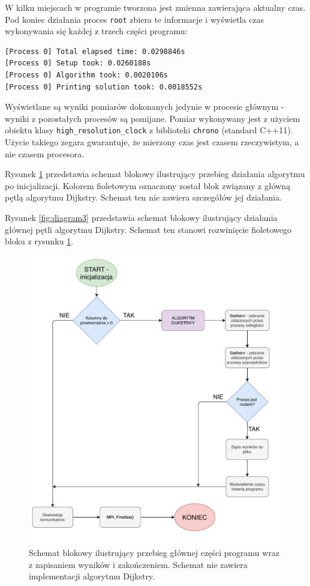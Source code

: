 \documentclass[12pt]{article}
\begin{document}
\vspace{5mm}
W kilku miejscach w programie tworzona jest zmienna zawierająca aktualny czas. Pod koniec działania proces \lstinline{root} zbiera te informacje i wyświetla czas wykonywania się każdej z trzech części programu:
\begin{lstlisting}
[Process 0] Total elapsed time: 0.0298846s
[Process 0] Setup took: 0.0260188s
[Process 0] Algorithm took: 0.0020106s
[Process 0] Printing solution took: 0.0018552s
\end{lstlisting}
Wyświetlane są wyniki pomiarów dokonanych jedynie w procesie głównym - wyniki z pozostałych procesów są pomijane. Pomiar wykonywany jest z użyciem obiektu klasy \lstinline{high_resolution_clock} z biblioteki \lstinline{chrono} (standard C++11). Użycie takiego zegara gwarantuje, że mierzony czas jest czasem rzeczywistym, a nie czasem procesora.

\vspace{5mm}
Rysunek \ref{fig:diagram2} przedstawia schemat blokowy ilustrujący przebieg działania algorytmu po inicjalizacji. Kolorem fioletowym oznaczony został blok związany z główną pętlą algorytmu Dijkstry. Schemat ten nie zawiera szczegółów jej działania.

\vspace{5mm}
Rysunek \ref{fig:diagram3} przedstawia schemat blokowy ilustrujący działania głównej pętli algorytmu Dijkstry. Schemat ten stanowi rozwinięcie fioletowego bloku z rysunku \ref{fig:diagram2}.

\begin{figure}[H]
\centering
\includegraphics[width=\textwidth]{static/Diagram2.pdf}
\caption{Schemat blokowy ilustrujący przebieg głównej części programu wraz z zapisaniem wyników i zakończeniem. Schemat nie zawiera implementacji algorytmu Dijkstry.}
\label{fig:diagram2}
\end{figure}
\end{document}
